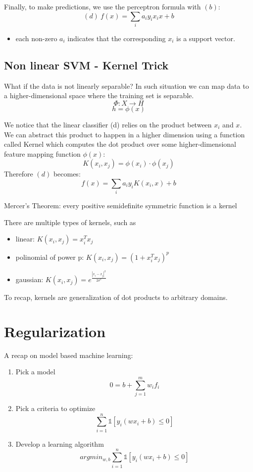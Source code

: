 \documentclass[11pt]{article}
\begin{document}
Finally, to make predictions, we use the perceptron formula with
\((b)\): \[(d)\ f(x) = \sum_i a_iy_i x_i x + b\]

\begin{itemize}
\tightlist
\item
  each non-zero \(a_i\) indicates that the corresponding \(x_i\) is a
  support vector.
\end{itemize}

\subsection{Non linear SVM - Kernel
Trick}\label{non-linear-svm---kernel-trick}

What if the data is not linearly separable? In such situation we can map
data to a higher-dimensional space where the training set is separable.
\[\Phi: X \rightarrow H\] \[h=\phi(x)\]

We notice that the linear classifier (d) relies on the product between
\(x_i\) and \(x\). We can abstract this product to happen in a higher
dimension using a function called Kernel which computes the dot product
over some higher-dimensional feature mapping function \(\phi(x)\):
\[K(x_i, x_j) = \phi(x_i)\cdot \phi(x_j)\] Therefore \((d)\) becomes:
\[ f(x) = \sum_i a_iy_i K(x_i, x) + b \]

Mercer's Theorem: every positive semidefinite symmetric function is a
kernel

There are multiple types of kernels, such as

\begin{itemize}
\tightlist
\item
  linear: \(K(x_i, x_j) = x_i^T x_j\)
\item
  polinomial of power p: \(K(x_i, x_j) = (1+x_i^T x_j)^p\)
\item
  gaussian: \(K(x_i, x_j) = e^{\frac{|x_i-x_j|^2}{2\sigma ^2}}\)
\end{itemize}

To recap, kernels are generalization of dot products to arbitrary
domains.

\section{Regularization}\label{regularization}

A recap on model based machine learning:

\begin{enumerate}
\def\labelenumi{\arabic{enumi}.}
\tightlist
\item
  Pick a model \[0=b+\sum_{j=1}^mw_if_i\]
\item
  Pick a criteria to optimize
  \[\sum_{i=1}^n\mathbb{1}[y_i(wx_i+b)\le 0]\]
\item
  Develop a learning algorithm
  \[argmin_{w, b}\sum_{i=1}^n\mathbb{1}[y_i(wx_i+b)\le 0]\]
\end{enumerate}
\end{document}
